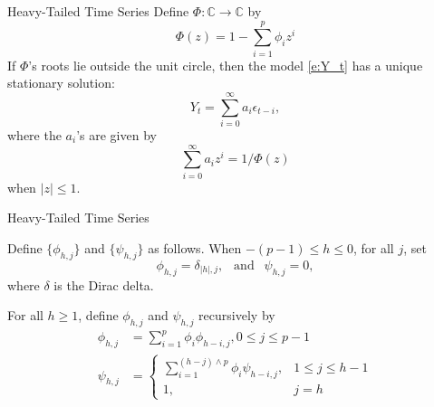 \documentclass{beamer}
\def\C{\mathbb C}
\def\P{\mathbb P}
\def\Z{{\mathbb Z}}
\begin{document}
\begin{frame}{Heavy-Tailed Time Series}
    Define $\Phi : \C \to \C$ by
    \[
    \Phi(z) = 1 - \sum_{i = 1}^p \phi_i z^i
    \]
    If $\Phi$'s roots lie outside the unit circle, then the model \eqref{e:Y_t} has a unique stationary solution:
    \begin{equation}\label{e:Y-as-a-moving-average}
        Y_t = \sum_{i = 0}^\infty a_i \epsilon_{t - i},
    \end{equation}
    where the $a_i$'s are given by
    \[
    \sum_{i = 0}^\infty a_i z^i = 1 / \Phi(z)
    \]
    when $|z| \le 1$.
\end{frame}


\begin{frame}{Heavy-Tailed Time Series}
    \begin{lemma}\label{lem:recursion}
        Define $\{\phi_{h, j}\}$ and $\{\psi_{h, j}\}$ as follows. When $-(p - 1) \le h \le 0$, for all $j$, set
        \[
        \phi_{h, j} = \delta_{|h|, j},\ \ \mbox{ and } \ \  \psi_{h, j} = 0,
        \]
        where $\delta$ is the Dirac delta.
    
        For all $h \ge 1$, define $\phi_{h, j}$ and $\psi_{h, j}$ recursively by
        \begin{align*}
            \phi_{h, j} &= \sum_{i = 1}^p \phi_i\phi_{h - i, j}, 0 \le j \le p - 1 \\
            \psi_{h, j} &=
            \begin{cases}
                \sum_{i = 1}^{(h - j) \wedge p} \phi_i\psi_{h - i, j}, & 1 \le j \le h - 1 \\
                1, & j = h
            \end{cases}
        \end{align*}
    \end{lemma}
\end{frame}
\end{document}
